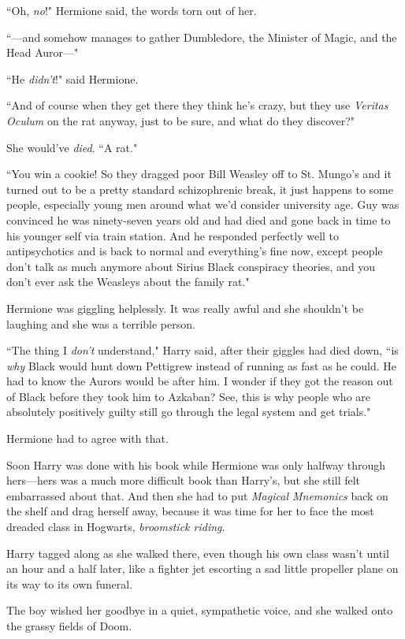 ``Oh, \emph{no}!" Hermione said, the words torn out of her.

``—and somehow manages to gather Dumbledore, the Minister of Magic, and the Head Auror—"

``He \emph{didn't}!" said Hermione.

``And of course when they get there they think he's crazy, but they use \emph{Veritas Oculum} on the rat anyway, just to be sure, and what do they discover?"

She would've \emph{died}. ``A rat."

``You win a cookie! So they dragged poor Bill Weasley off to St. Mungo's and it turned out to be a pretty standard schizophrenic break, it just happens to some people, especially young men around what we'd consider university age. Guy was convinced he was ninety-seven years old and had died and gone back in time to his younger self via train station. And he responded perfectly well to antipsychotics and is back to normal and everything's fine now, except people don't talk as much anymore about Sirius Black conspiracy theories, and you don't ever ask the Weasleys about the family rat."

Hermione was giggling helplessly. It was really awful and she shouldn't be laughing and she was a terrible person.

``The thing I \emph{don't} understand," Harry said, after their giggles had died down, ``is \emph{why} Black would hunt down Pettigrew instead of running as fast as he could. He had to know the Aurors would be after him. I wonder if they got the reason out of Black before they took him to Azkaban? See, this is why people who are absolutely positively guilty still go through the legal system and get trials."

Hermione had to agree with that.

Soon Harry was done with his book while Hermione was only halfway through hers—hers was a much more difficult book than Harry's, but she still felt embarrassed about that. And then she had to put \emph{Magical Mnemonics} back on the shelf and drag herself away, because it was time for her to face the most dreaded class in Hogwarts, \emph{broomstick riding}.

Harry tagged along as she walked there, even though his own class wasn't until an hour and a half later, like a fighter jet escorting a sad little propeller plane on its way to its own funeral.

The boy wished her goodbye in a quiet, sympathetic voice, and she walked onto the grassy fields of Doom.

